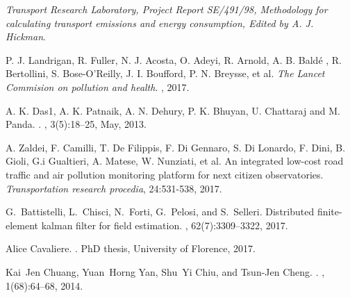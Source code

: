 \documentclass[journal]{IEEEtran}
\begin{document}
%
%
%
\begin{thebibliography}{99}
{\em {Transport Research Laboratory, Project Report SE/491/98, Methodology for
  calculating transport emissions and energy consumption, Edited by A. J.
  Hickman}}.

{ P. J. Landrigan, R. Fuller, N. J. Acosta, O. Adeyi, R. Arnold, A. B. Bald\'e
  , R. Bertollini, S. Bose-O'Reilly, J. I. Boufford, P. N. Breysse, et al.
  \textit{The Lancet Commision on pollution and health}}.
, 2017.

{A. K. Das1, A. K. Patnaik, A. N. Dehury, P. K. Bhuyan, U. Chattaraj and M.
  Panda}.
.
, 3(5):18--25, {May,
  2013}.

{A. Zaldei, F. Camilli, T. De Filippis, F. Di Gennaro, S. Di Lonardo, F. Dini,
  B. Gioli, G.i Gualtieri, A. Matese, W. Nunziati, et al. An integrated
  low-cost road traffic and air pollution monitoring platform for next citizen
  observatories. \textit{Transportation research procedia}, 24:531-538, 2017.}

G.~Battistelli, L.~Chisci, N.~Forti, G.~Pelosi, and S.~Selleri.
\newblock Distributed finite-element kalman filter for field estimation.
, 62(7):3309--3322, 2017.

Alice Cavaliere.
.
\newblock PhD thesis, University of Florence, 2017.

Kai~Jen Chuang, Yuan~Horng Yan, Shu~Yi Chiu, and Tsun-Jen Cheng.
.
, 1(68):64--68, 2014.


\end{thebibliography}
\end{document}
